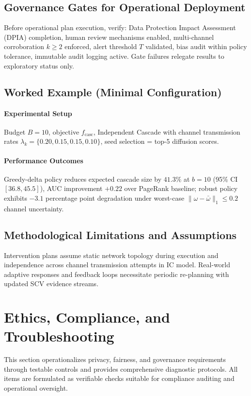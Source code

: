 \documentclass[12pt]{article}
\theoremstyle{plain}
\begin{document}
\subsection{Governance Gates for Operational Deployment}
Before operational plan execution, verify: Data Protection Impact Assessment (DPIA) completion, human review mechanisms enabled, multi-channel corroboration $k\ge2$ enforced, alert threshold $T$ validated, bias audit within policy tolerance, immutable audit logging active. Gate failures relegate results to exploratory status only.

\subsection{Worked Example (Minimal Configuration)}
\paragraph{Experimental Setup} Budget $B=10$, objective $f_{\text{casc}}$, Independent Cascade with channel transmission rates $\lambda_k=\{0.20,0.15,0.15,0.10\}$, seed selection = top-5 diffusion scores.
\paragraph{Performance Outcomes} Greedy-delta policy reduces expected cascade size by $41.3\%$ at $b{=}10$ (95\% CI $[36.8,45.5]$), AUC improvement $+0.22$ over PageRank baseline; robust policy exhibits $-3.1$ percentage point degradation under worst-case $\|\omega-\bar{\omega}\|_1\le0.2$ channel uncertainty.

\subsection{Methodological Limitations and Assumptions}
Intervention plans assume static network topology during execution and independence across channel transmission attempts in IC model. Real-world adaptive responses and feedback loops necessitate periodic re-planning with updated SCV evidence streams.

\section{Ethics, Compliance, and Troubleshooting}
\label{sec:ethics}
\noindent This section operationalizes privacy, fairness, and governance requirements through testable controls and provides comprehensive diagnostic protocols. All items are formulated as verifiable checks suitable for compliance auditing and operational oversight.
\end{document}

